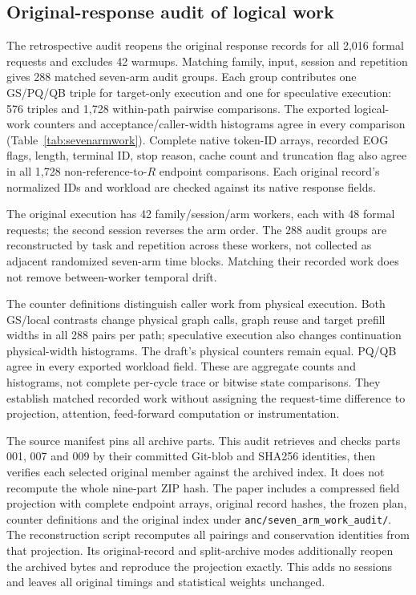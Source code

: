 \subsection{Original-response audit of logical work}
\label{supp:sevenarmwork}
The retrospective audit reopens the original response records for all 2,016 formal requests and excludes 42 warmups. Matching family, input, session and repetition gives 288 matched seven-arm audit groups. Each group contributes one GS/PQ/QB triple for target-only execution and one for speculative execution: 576 triples and 1,728 within-path pairwise comparisons. The exported logical-work counters and acceptance/caller-width histograms agree in every comparison (Table~\ref{tab:sevenarmwork}). Complete native token-ID arrays, recorded EOG flags, length, terminal ID, stop reason, cache count and truncation flag also agree in all 1,728 non-reference-to-$R$ endpoint comparisons. Each original record's normalized IDs and workload are checked against its native response fields.



The original execution has 42 family/session/arm workers, each with 48 formal requests; the second session reverses the arm order. The 288 audit groups are reconstructed by task and repetition across these workers, not collected as adjacent randomized seven-arm time blocks. Matching their recorded work does not remove between-worker temporal drift.

The counter definitions distinguish caller work from physical execution. Both GS/local contrasts change physical graph calls, graph reuse and target prefill widths in all 288 pairs per path; speculative execution also changes continuation physical-width histograms. The draft's physical counters remain equal. PQ/QB agree in every exported workload field. These are aggregate counts and histograms, not complete per-cycle trace or bitwise state comparisons. They establish matched recorded work without assigning the request-time difference to projection, attention, feed-forward computation or instrumentation.

The source manifest pins all archive parts. This audit retrieves and checks parts 001, 007 and 009 by their committed Git-blob and SHA256 identities, then verifies each selected original member against the archived index. It does not recompute the whole nine-part ZIP hash. The paper includes a compressed field projection with complete endpoint arrays, original record hashes, the frozen plan, counter definitions and the original index under \texttt{anc/seven\_arm\_work\_audit/}. The reconstruction script recomputes all pairings and conservation identities from that projection. Its original-record and split-archive modes additionally reopen the archived bytes and reproduce the projection exactly. This adds no sessions and leaves all original timings and statistical weights unchanged.

